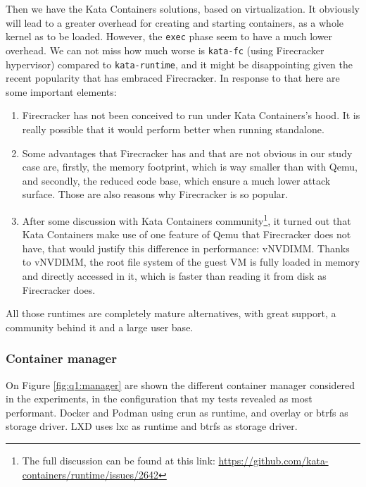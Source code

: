 Then we have the Kata Containers solutions, based on virtualization.  It obviously will lead to a greater overhead for creating and starting containers, as a whole kernel as to be loaded.  However, the \texttt{exec} phase seem to have a much lower overhead.  We can not miss how much worse is \texttt{kata-fc} (using Firecracker hypervisor) compared to \texttt{kata-runtime}, and it might be disappointing given the recent popularity that has embraced Firecracker.  In response to that here are some important elements:
\begin{enumerate}
  \item Firecracker has not been conceived to run under Kata Containers's hood.  It is really possible that it would perform better when running standalone.
  \item Some advantages that Firecracker has and that are not obvious in our study case are, firstly, the memory footprint, which is way smaller than with Qemu, and secondly, the reduced code base, which ensure a much lower attack surface.  Those are also reasons why Firecracker is so popular.
  \item After some discussion with Kata Containers community\footnote{The full discussion can be found at this link: \href{https://github.com/kata-containers/runtime/issues/2642}{https://github.com/kata-containers/runtime/issues/2642}}, it turned out that Kata Containers make use of one feature of Qemu that Firecracker does not have, that would justify this difference in performance: vNVDIMM.  Thanks to vNVDIMM, the root file system of the guest VM is fully loaded in memory and directly accessed in it, which is faster than reading it from disk as Firecracker does.
\end{enumerate}

All those runtimes are completely mature alternatives, with great support, a community behind it and a large user base.  

\subsubsection{Container manager}

On Figure \ref{fig:q1:manager} are shown the different container manager considered in the experiments, in the configuration that my tests revealed as most performant.  Docker and Podman using crun as runtime, and overlay or btrfs as storage driver.  LXD uses lxc as runtime and btrfs as storage driver.

